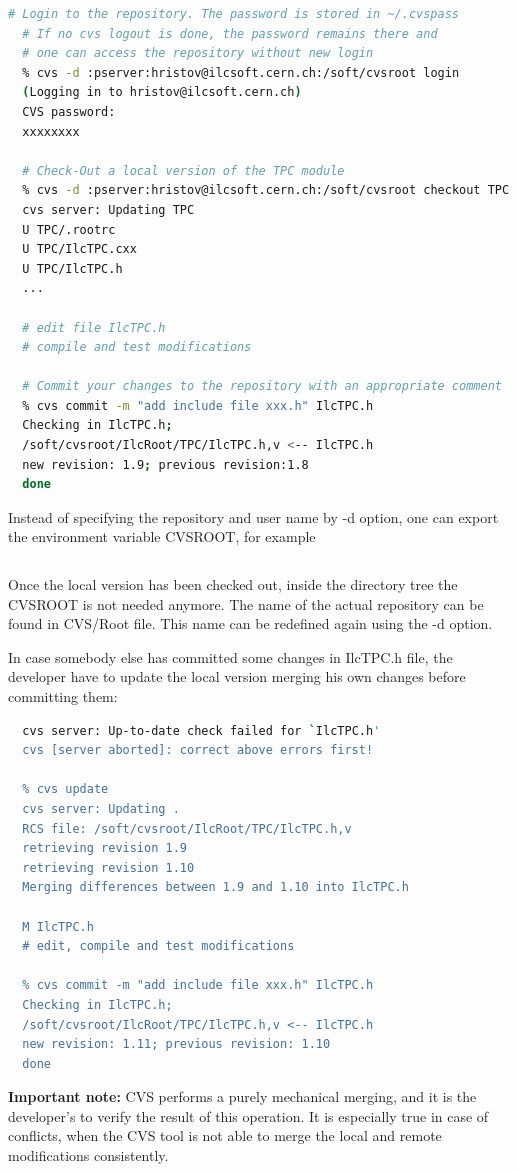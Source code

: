 \documentclass[12pt,a4paper,twoside]{article}
\begin{document}
\begin{lstlisting}[language=sh]
  # Login to the repository. The password is stored in ~/.cvspass
  # If no cvs logout is done, the password remains there and
  # one can access the repository without new login 
  % cvs -d :pserver:hristov@ilcsoft.cern.ch:/soft/cvsroot login
  (Logging in to hristov@ilcsoft.cern.ch)
  CVS password:
  xxxxxxxx

  # Check-Out a local version of the TPC module
  % cvs -d :pserver:hristov@ilcsoft.cern.ch:/soft/cvsroot checkout TPC
  cvs server: Updating TPC
  U TPC/.rootrc
  U TPC/IlcTPC.cxx
  U TPC/IlcTPC.h
  ...

  # edit file IlcTPC.h
  # compile and test modifications

  # Commit your changes to the repository with an appropriate comment
  % cvs commit -m "add include file xxx.h" IlcTPC.h
  Checking in IlcTPC.h;
  /soft/cvsroot/IlcRoot/TPC/IlcTPC.h,v <-- IlcTPC.h
  new revision: 1.9; previous revision:1.8
  done

\end{lstlisting}

Instead of specifying the repository and user name by -d option, one
can export the environment variable CVSROOT, for example

\begin{lstlisting}[language=sh]
  % export CVSROOT=:pserver:hristov@ilcsoft.cern.ch:/soft/cvsroot
\end{lstlisting}

Once the local version has been checked out, inside the directory tree
the CVSROOT is not needed anymore. The name of the actual repository
can be found in CVS/Root file. This name can be redefined again using
the -d option.

In case somebody else has committed some changes in IlcTPC.h file, the
developer have to update the local version merging his own changes
before committing them:

\begin{lstlisting}[language=sh]
  % cvs commit -m "add include file xxx.h" IlcTPC.h
  cvs server: Up-to-date check failed for `IlcTPC.h'
  cvs [server aborted]: correct above errors first!

  % cvs update
  cvs server: Updating .
  RCS file: /soft/cvsroot/IlcRoot/TPC/IlcTPC.h,v
  retrieving revision 1.9
  retrieving revision 1.10
  Merging differences between 1.9 and 1.10 into IlcTPC.h

  M IlcTPC.h
  # edit, compile and test modifications

  % cvs commit -m "add include file xxx.h" IlcTPC.h
  Checking in IlcTPC.h;
  /soft/cvsroot/IlcRoot/TPC/IlcTPC.h,v <-- IlcTPC.h
  new revision: 1.11; previous revision: 1.10
  done

\end{lstlisting}
\textbf{Important note:} CVS performs a purely mechanical merging, and
it is  the developer's to verify  the result of this  operation. It is
especially true in case of conflicts, when the CVS tool is not able to
merge the local and remote modifications consistently.
\end{document}
